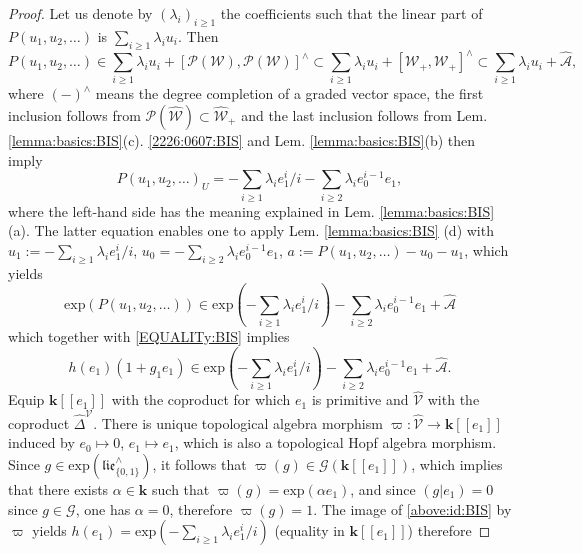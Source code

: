 \documentclass[10pt]{amsart}
\numberwithin{equation}{subsection}
\begin{document}
\begin{proof}
Let us denote by $(\lambda_i)_{i\geq 1}$ the coefficients such that the linear part of 
$P(u_1,u_2,\ldots)$ is $\sum_{i\geq 1}\lambda_i u_i$. Then 
\begin{equation}\label{2226:0607:BIS}
 P(u_1,u_2,\ldots)\in
\sum_{i\geq 1}\lambda_i u_i+[\mathcal P(\mathcal W),\mathcal P(\mathcal W)]^\wedge
\subset \sum_{i\geq 1}\lambda_i u_i+[\mathcal W_+,\mathcal W_+]^\wedge \subset 
\sum_{i\geq 1}\lambda_i u_i+\hat{\mathcal A},    
\end{equation}
where $(-)^\wedge$ means the degree completion of a graded vector space, 
the first inclusion follows from $\mathcal P(\hat{\mathcal W})\subset\hat{\mathcal W}_+$ and the last inclusion follows from 
Lem. \ref{lemma:basics:BIS}(c). \eqref{2226:0607:BIS} and Lem. \ref{lemma:basics:BIS}(b) then 
imply 
$$%
 P(u_1,u_2,\ldots)_U=-\sum_{i\geq 1}\lambda_ie_1^i/i-\sum_{i\geq 2}\lambda_ie_0^{i-1}e_1,    
$$%
where the left-hand side has the meaning explained in Lem. \ref{lemma:basics:BIS}(a).
The latter equation enables one to apply Lem. \ref{lemma:basics:BIS} (d) with $u_1:=-\sum_{i\geq 1}\lambda_ie_1^i/i$, 
$u_0=-\sum_{i\geq 2}\lambda_ie_0^{i-1}e_1$, $a:=P(u_1,u_2,\ldots)-u_0-u_1$, which yields
$$
\mathrm{exp}(P(u_1,u_2,\ldots))\in\mathrm{exp}(-\sum_{i\geq 1}\lambda_ie_1^i/i)-\sum_{i\geq 2}\lambda_ie_0^{i-1}e_1+\hat{\mathcal A}
$$
which together with \eqref{EQUALITy:BIS} implies
\begin{equation}\label{above:id:BIS}
h(e_1)(1+g_1e_1)\in\mathrm{exp}(-\sum_{i\geq 1}\lambda_ie_1^i/i)-\sum_{i\geq 2}\lambda_ie_0^{i-1}e_1+\hat{\mathcal A}. 
\end{equation}
Equip $\mathbf k[[e_1]]$ with the coproduct for which $e_1$ is primitive and $\hat{\mathcal V}$ with the coproduct 
$\hat\Delta^{\mathcal V}$. There is unique topological algebra morphism $\varpi : \hat{\mathcal V}\to\mathbf k[[e_1]]$ induced 
by $e_0\mapsto 0$, $e_1\mapsto e_1$, which is also a topological Hopf algebra morphism. Since $g\in\mathrm{exp}(\mathfrak{lie}_{\{0,1\}}^\wedge)$, 
it follows that $\varpi(g)\in\mathcal G(\mathbf k[[e_1]])$, which implies that there exists $\alpha\in\mathbf k$ such that 
$\varpi(g)=\mathrm{exp}(\alpha e_1)$, and since $(g|e_1)=0$ since $g\in\mathcal G$, one has $\alpha=0$, therefore 
$\varpi(g)=1$. The image of \eqref{above:id:BIS} by $\varpi$ yields 
$h(e_1)=\mathrm{exp}(-\sum_{i\geq 1}\lambda_ie_1^i/i)$ (equality in $\mathbf k[[e_1]]$) therefore 

\end{proof}
\end{document}
